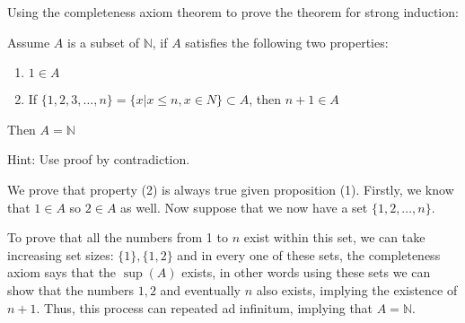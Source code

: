 \documentclass[10pt]{article}
\begin{document}
    Using the completeness axiom theorem to prove the theorem for strong induction:

    \begin{theorem}
        Assume $A$ is a subset of $\mathbb N$, if $A$ satisfies the following two properties: 

        \begin{enumerate}[(1)]
            \item $1 \in A$
            \item If $\{1, 2, 3, \dots, n\} = \{ x \vert x \le n, x \in N\} \subset A$, then $n+1 \in A$
        \end{enumerate}

        Then $A = \mathbb N$
    \end{theorem}

    Hint: Use proof by contradiction.


    \begin{solution}
        We prove that property (2) is always true given proposition (1). Firstly, we know that $1 \in A$ so $2 \in A$ as well. Now suppose that we now have a set $\{1, 2, \dots, n \}$. 
        
        To prove that all the numbers from 1 to $n$ exist within this set, we can take increasing set sizes: $\{1\}, \{1, 2\}$ and in every one of these sets, the completeness axiom says that the $\sup(A)$ exists, in other words using these sets we can show that the numbers $1, 2$ and eventually $n$ also exists, implying the existence of $n+1$. Thus, this process can repeated ad infinitum, implying that $A = \mathbb N$.
    \end{solution}
    
    
\end{document}
